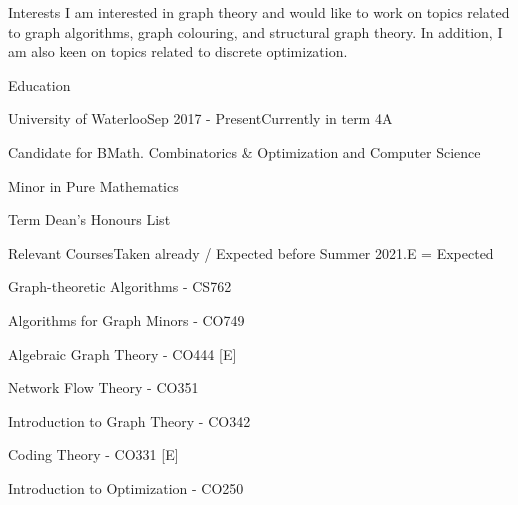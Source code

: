 \documentclass{cv}
\begin{document}
\begin{rSection}{Interests}
	I am interested in graph theory and would like to work on topics related to graph algorithms, graph colouring, and structural graph theory. In addition, I am also keen on topics related to discrete optimization.
\end{rSection}

\begin{rSection}{Education}
\begin{rSubsection}{University of Waterloo}{Sep 2017 - Present}{Currently in term 4A}{}
	\item Candidate for BMath. Combinatorics \& Optimization and Computer Science
	\item Minor in Pure Mathematics
	\item Term Dean's Honours List
\end{rSubsection}


\begin{rSubsection}{Relevant Courses}{}{Taken already / Expected before Summer 2021.}{E = Expected}
	\item Graph-theoretic Algorithms - CS762
	\item Algorithms for Graph Minors - CO749
	\item Algebraic Graph Theory - CO444 [E]
	\item Network Flow Theory - CO351
	\item Introduction to Graph Theory - CO342
	\item Coding Theory - CO331 [E]
	\item Introduction to Optimization - CO250
\end{rSubsection}



\end{rSection}
\end{document}
